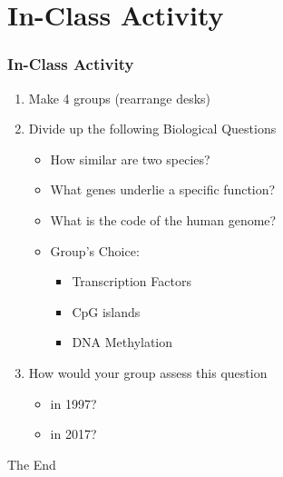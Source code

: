 \documentclass[14pt]{beamer}
\begin{document}
\section{In-Class Activity}

\begin{frame}
\frametitle{In-Class Activity}
	\begin{enumerate}
	\item<1-> Make 4 groups (rearrange desks)
	\item<2-> Divide up the following Biological Questions
		\begin{itemize}
			\item<3-> How similar are two species?
			\item<4-> What genes underlie a specific function?
			\item<5-> What is the code of the human genome?
			\item<6-> Group's Choice:
			\begin{itemize}
			\item Transcription Factors
			\item CpG islands
			\item DNA Methylation
			\end{itemize}
		\end{itemize}
	\item<7-> How would your group assess this question 
	\begin{itemize}
		\item in 1997?
		\item in 2017?
	\end{itemize}
	\end{enumerate}
\end{frame}

\begin{frame}
\Huge{\centerline{The End}}
\end{frame}

\end{document}
